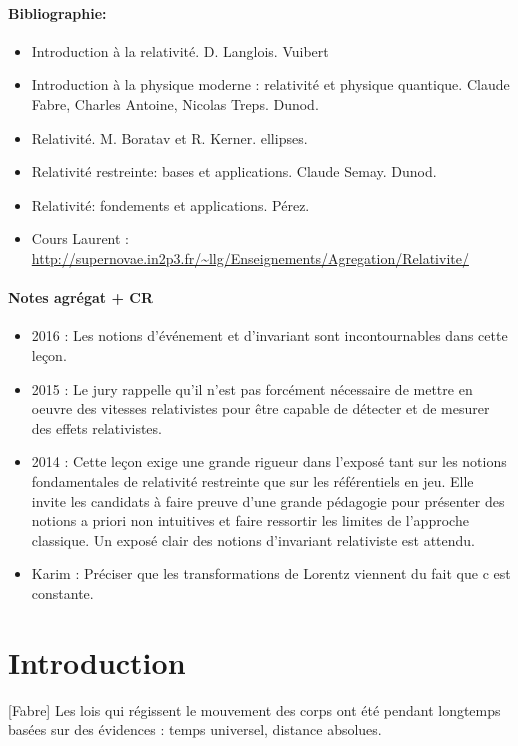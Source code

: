 \documentclass[11pt]{report}
\numberwithin{figure}{section}
\numberwithin{equation}{section}
\numberwithin{table}{section}
\newcommand{\1}{\boldsymbol{1}}
\begin{document}
\paragraph*{Bibliographie:}
\begin{itemize}
\item Introduction à la relativité. D. Langlois. Vuibert
\item Introduction à la physique moderne : relativité et physique quantique. Claude Fabre, Charles Antoine, Nicolas Treps. Dunod.
\item Relativité. M. Boratav et R. Kerner. ellipses.
\item Relativité restreinte: bases et applications. Claude Semay. Dunod.
\item Relativité: fondements et applications. Pérez.
\item Cours Laurent : \url{http://supernovae.in2p3.fr/~llg/Enseignements/Agregation/Relativite/}
\end{itemize}

\paragraph*{Notes agrégat + CR}
\begin{itemize}
\item 2016 : Les notions d’événement et d’invariant sont incontournables dans cette leçon.
\item 2015 : Le jury rappelle qu’il n’est pas forcément nécessaire de mettre en oeuvre des vitesses relativistes pour être capable de détecter et de mesurer des effets relativistes.
\item 2014 : Cette leçon exige une grande rigueur dans l’exposé tant sur les notions fondamentales de relativité restreinte que sur les référentiels en jeu. Elle invite les candidats à faire preuve d’une grande pédagogie pour présenter des notions a priori non intuitives et faire ressortir les limites de l’approche classique. Un exposé clair des notions d’invariant relativiste est attendu.
\item Karim : Préciser que les transformations de Lorentz viennent du fait que c est constante.
\end{itemize}


\section*{Introduction}
  
[Fabre] Les lois qui régissent le mouvement des corps ont été pendant longtemps basées sur des évidences : temps universel, distance absolues. 
\end{document}
